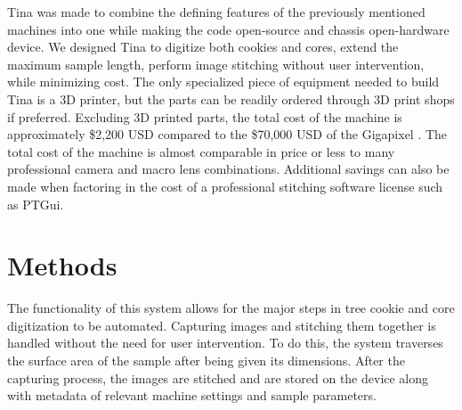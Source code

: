 \documentclass[a4paper,12pt]{article}
\begin{document}
Tina was made to combine the defining features of the previously mentioned machines into one while making the code open-source and chassis open-hardware device. 
We designed Tina to digitize both cookies and cores, extend the maximum sample length, perform image stitching without user intervention, while minimizing cost. 
The only specialized piece of equipment needed to build Tina is a 3D printer, but the parts can be readily ordered through 3D print shops if preferred.
Excluding 3D printed parts, the total cost of the machine is approximately \$2,200 USD compared to the \$70,000 USD of the Gigapixel \citep{griffin_gigapixel_2021}.
The total cost of the machine is almost comparable in price or less to many professional camera and macro lens combinations.
Additional savings can also be made when factoring in the cost of a professional stitching software license such as PTGui. 

\section{Methods}
The functionality of this system allows for the major steps in tree cookie and core digitization to be automated. Capturing images and stitching them together is handled without the need for user intervention. 
To do this, the system traverses the surface area of the sample after being given its dimensions. After the capturing process, the images are stitched and are stored on the device along with metadata of relevant machine
settings and sample parameters. 



\end{document}
